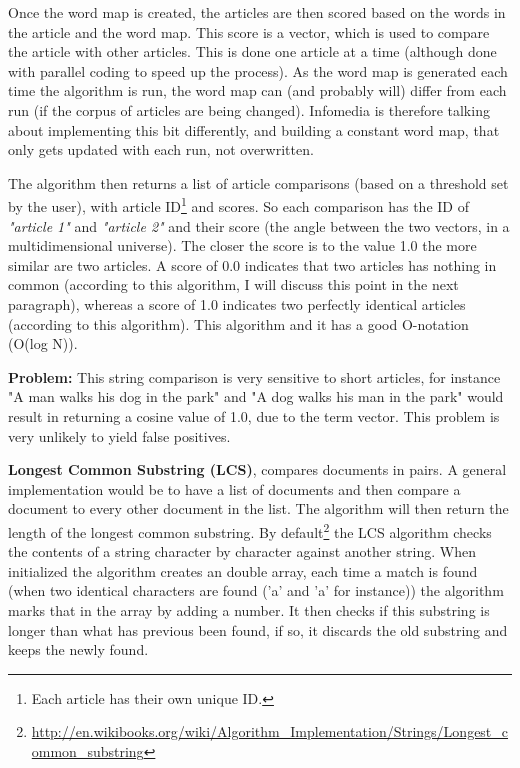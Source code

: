 Once the word map is created, the articles are then scored based on the words in the article and the word map. This score is a vector, which is used to compare the article with other articles. This is done one article at a time (although done with parallel coding to speed up the process). As the word map is generated each time the algorithm is run, the word map can (and probably will) differ from each run (if the corpus of articles are being changed). Infomedia is therefore talking about implementing this bit differently, and building a constant word map, that only gets updated with each run, not overwritten.

The algorithm then returns a list of article comparisons (based on a threshold set by the user), with article ID\footnote{Each article has their own unique ID.} and scores. So each comparison has the ID of \textit{"article 1"} and \textit{"article 2"} and their score (the angle between the two vectors, in a multidimensional universe). The closer the score is to the value 1.0 the more similar are two articles. A score of 0.0 indicates that two articles has nothing in common (according to this algorithm, I will discuss this point in the next paragraph), whereas a score of 1.0 indicates two perfectly identical articles (according to this algorithm). This algorithm and it has a good O-notation (O(log N)).

\textbf{Problem:} This string comparison is very sensitive to short articles, for instance "A man walks his dog in the park" and "A dog walks his man in the park" would result in returning a cosine value of 1.0, due to the term vector. This problem is very unlikely to yield false positives.

\textbf{Longest Common Substring (LCS)}, compares documents in pairs. A general implementation would be to have a list of documents and then compare a document to every other document in the list. The algorithm will then return the length of the longest common substring. By default\footnote{\url{http://en.wikibooks.org/wiki/Algorithm_Implementation/Strings/Longest_common_substring}} the LCS algorithm checks the contents of a string character by character against another string. When initialized the algorithm creates an double array, each time a match is found (when two identical characters are found ('a' and 'a' for instance)) the algorithm marks that in the array by adding a number. It then checks if this substring is longer than what has previous been found, if so, it discards the old substring and keeps the newly found.

